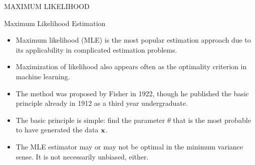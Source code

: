 \documentclass[10pt, aspectratio=169]{beamer} %
\newcommand{\x}{{\bf x}}
\begin{document}
%


\begin{frame}
\vspace*{2cm}
\centerline{\Large MAXIMUM LIKELIHOOD}
\end{frame}


\begin{frame}[allowframebreaks=0.8]
{Maximum Likelihood Estimation}
\begin{itemize}
\item Maximum likelihood (MLE) is the most popular estimation approach
  due to its applicability in complicated estimation problems.
	\item Maximization of likelihood also appears often as the optimality criterion in machine learning.
\item The method was proposed by Fisher in 1922, though he published
  the basic principle already in 1912 as a third year undergraduate.
\item The basic principle is simple: find the parameter $\theta$ that
  is the most probable to have generated the data $\x$.
\item The MLE estimator may or may not be optimal in the minimum
  variance sense. It is not necessarily unbiased, either.
\end{itemize}
\end{frame}
\end{document}
